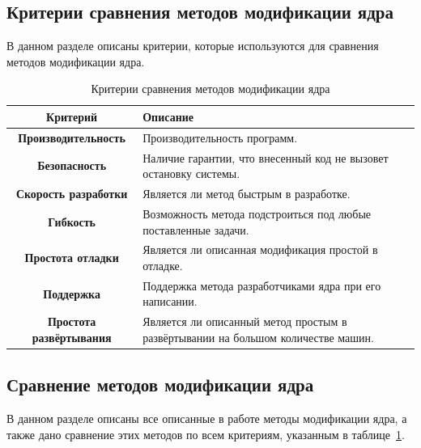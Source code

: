 \subsection{Критерии сравнения методов модификации ядра}\label{sec:----}
В данном разделе описаны критерии, которые используются для сравнения методов модификации ядра.

\begin{table}[ht]
    \begin{center}
        \begin{threeparttable}
            \captionsetup{justification=raggedright,singlelinecheck=off}
            \caption{\label{tab:criteria}Критерии сравнения методов модификации ядра}
            \begin{tabular}{|c|p{8cm}|}
                \hline
                \textbf{Критерий} & \textbf{Описание} \\ \hline
                \textbf{Производительность} & Производительность программ. \\ \hline
                \textbf{Безопасность} & Наличие гарантии, что внесенный код не вызовет остановку системы. \\ \hline
                \textbf{Скорость разработки} & Является ли метод быстрым в разработке. \\ \hline
                \textbf{Гибкость} & Возможность метода подстроиться под любые поставленные задачи. \\ \hline
                \textbf{Простота отладки} & Является ли описанная модификация простой в отладке. \\ \hline
                \textbf{Поддержка} & Поддержка метода разработчиками ядра при его написании. \\ \hline
                \textbf{Простота развёртывания} & Является ли описанный метод простым в развёртывании на большом количестве машин. \\ \hline
            \end{tabular}
        \end{threeparttable}
    \end{center}
\end{table}
\newpage
\subsection{Сравнение методов модификации ядра}\label{sec:---}
В данном разделе описаны все описанные в работе методы модификации ядра, а также дано сравнение этих методов по всем критериям, указанным в таблице~\ref{tab:criteria}.

